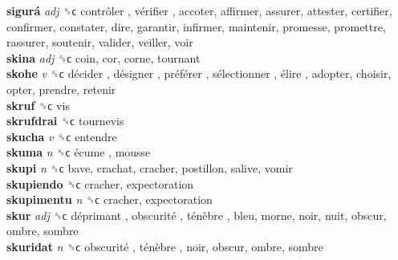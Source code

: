 \textbf{sigurá} \emph{adj}  ␝ϲ   contrôler ,  vérifier , accoter, affirmer, assurer, attester, certifier, confirmer, constater, dire, garantir, infirmer, maintenir, promesse, promettre, rassurer, soutenir, valider, veiller, voir  \\
\textbf{skina} \emph{adj}  ␝ϲ  coin, cor, corne, tournant  \\
\textbf{skohe} \emph{v}  ␝ϲ   décider ,  désigner ,  préférer ,  sélectionner ,  élire , adopter, choisir, opter, prendre, retenir  \\
\textbf{skruf} ␝ϲ  vis  \\
\textbf{skrufdrai} ␝ϲ  tournevis  \\
\textbf{skucha} \emph{v}  ␝ϲ  entendre  \\
\textbf{skuma} \emph{n}  ␝ϲ   écume , mousse  \\
\textbf{skupi} \emph{n}  ␝ϲ  bave, crachat, cracher, postillon, salive, vomir  \\
\textbf{skupiendo} ␝ϲ  cracher, expectoration  \\
\textbf{skupimentu} \emph{n}  ␝ϲ  cracher, expectoration  \\
\textbf{skur} \emph{adj}  ␝ϲ   déprimant ,  obscurité ,  ténèbre , bleu, morne, noir, nuit, obscur, ombre, sombre  \\
\textbf{skuridat} \emph{n}  ␝ϲ   obscurité ,  ténèbre , noir, obscur, ombre, sombre  \\
